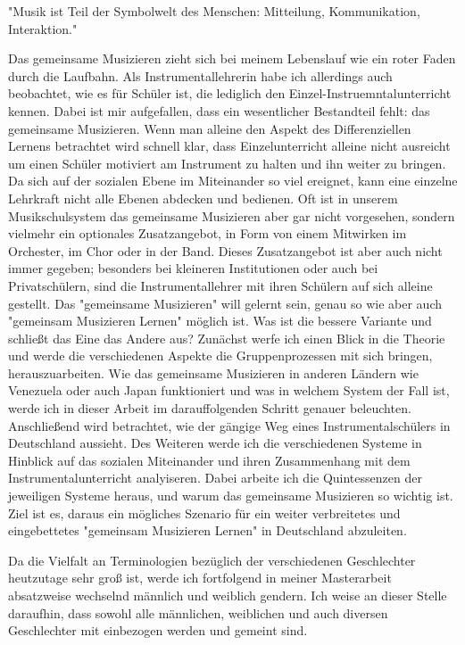 
"Musik ist Teil der Symbolwelt des Menschen: Mitteilung, Kommunikation,
Interaktion." \autocite[91]{doerne:umfassend_musizieren}

Das gemeinsame Musizieren zieht sich bei meinem Lebenslauf wie ein roter Faden
durch die Laufbahn. Als Instrumentallehrerin habe ich allerdings auch
beobachtet, wie es für Schüler ist, die lediglich den
Einzel-Instruemntalunterricht kennen. Dabei ist mir aufgefallen, dass ein
wesentlicher Bestandteil fehlt: das gemeinsame Musizieren. Wenn man alleine den
Aspekt des Differenziellen Lernens betrachtet wird schnell klar, dass
Einzelunterricht alleine nicht ausreicht um einen Schüler motiviert am
Instrument zu halten und ihn weiter zu bringen. Da sich auf der sozialen Ebene
im Miteinander so viel ereignet, kann eine einzelne Lehrkraft nicht alle Ebenen
abdecken und bedienen. Oft ist in unserem Musikschulsystem das gemeinsame
Musizieren aber gar nicht vorgesehen, sondern vielmehr ein optionales
Zusatzangebot, in Form von einem Mitwirken im Orchester, im Chor oder in der
Band. Dieses Zusatzangebot ist aber auch nicht immer gegeben; besonders bei
kleineren Institutionen oder auch bei Privatschülern, sind die
Instrumentallehrer mit ihren Schülern auf sich alleine gestellt. Das "gemeinsame
Musizieren" will gelernt sein, genau so wie aber auch "gemeinsam Musizieren
Lernen" möglich ist. Was ist die bessere Variante und schließt das Eine das
Andere aus? Zunächst werfe ich einen Blick in die Theorie und werde die
verschiedenen Aspekte die Gruppenprozessen mit sich bringen, herauszuarbeiten.
Wie das gemeinsame Musizieren in anderen Ländern wie Venezuela oder auch Japan
funktioniert und was in welchem System der Fall ist, werde ich in dieser Arbeit
im darauffolgenden Schritt genauer beleuchten. Anschließend wird betrachtet, wie
der gängige Weg eines Instrumentalschülers in Deutschland aussieht. Des Weiteren
werde ich die verschiedenen Systeme in Hinblick auf das sozialen Miteinander und
ihren Zusammenhang mit dem Instrumentalunterricht analyiseren. Dabei arbeite ich
die Quintessenzen der jeweiligen Systeme heraus, und warum das gemeinsame
Musizieren so wichtig ist. Ziel ist es, daraus ein mögliches Szenario für ein
weiter verbreitetes und eingebettetes "gemeinsam Musizieren Lernen" in
Deutschland abzuleiten.


Da die Vielfalt an Terminologien bezüglich der verschiedenen Geschlechter
heutzutage sehr groß ist, werde ich fortfolgend in meiner Masterarbeit
absatzweise wechselnd männlich und weiblich gendern. Ich weise an dieser Stelle
daraufhin, dass sowohl alle männlichen, weiblichen und auch diversen
Geschlechter mit einbezogen werden und gemeint sind. 
